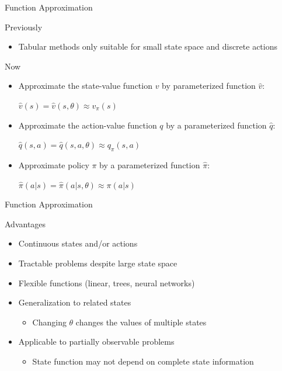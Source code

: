 \documentclass[ignorenonframetext,xcolor=x11names]{beamer}
\begin{document}
\begin{frame}{Function Approximation}
\begin{block}{Previously}
\begin{itemize}
\item Tabular methods only suitable for small state space and discrete actions
\end{itemize}
\end{block}

\begin{block}{Now}
\begin{itemize}
\item Approximate the state-value function $v$ by parameterized function $\hat{v}$:\\
\begin{center}
$\hat{v}(s) = \hat{v}(s, \theta) \approx v_{\pi}(s)$ \end{center}
\item Approximate the action-value function $q$ by a parameterized function $\hat{q}$: \\ \vspace{.25\baselineskip}
\begin{center}
$\hat{q}(s, a) = \hat{q}(s, a, \theta) \approx q_{\pi}(s, a)$
\end{center}
\item Approximate policy $\pi$ by a parameterized function $\hat{\pi}$: \\ \vspace{.25\baselineskip}
\begin{center}
$\hat{\pi}(a | s) = \hat{\pi}(a | s, \theta) \approx \pi(a | s)$
\end{center}
\end{itemize}
\end{block}
\end{frame}

\begin{frame}{Function Approximation}
\begin{block}{Advantages}
\begin{itemize}
\item Continuous states and/or actions
\item Tractable problems despite large state space
\item Flexible functions (linear, trees, neural networks)
\item Generalization to related states
\begin{itemize}
   \item Changing $\theta$ changes the values of multiple states
\end{itemize}
\item Applicable to partially observable problems
\begin{itemize}
   \item State function may not depend on complete state information
\end{itemize}
\end{itemize}
\end{block}
\end{frame}
\end{document}
